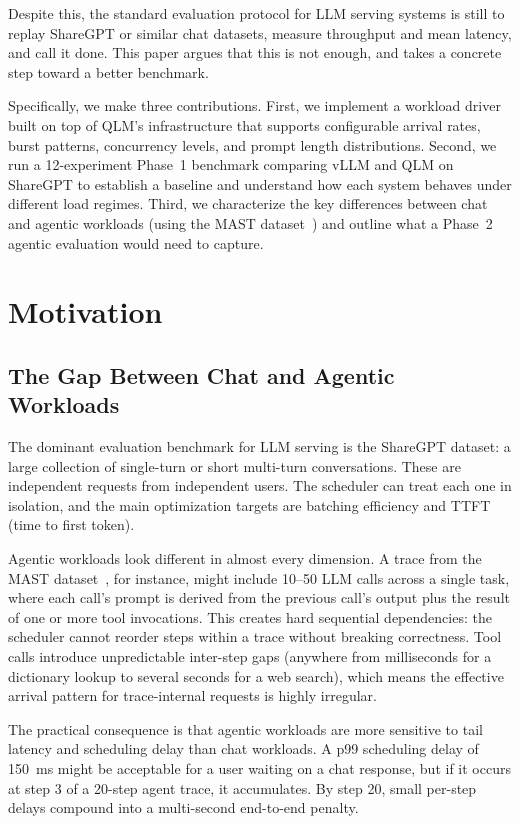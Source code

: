 \documentclass[10pt, twocolumn, letterpaper]{article}
\begin{document}
Despite this, the standard evaluation protocol for LLM serving systems is still to replay ShareGPT or similar chat datasets, measure throughput and mean latency, and call it done. This paper argues that this is not enough, and takes a concrete step toward a better benchmark.

Specifically, we make three contributions. First, we implement a workload driver built on top of QLM's infrastructure that supports configurable arrival rates, burst patterns, concurrency levels, and prompt length distributions. Second, we run a 12-experiment Phase~1 benchmark comparing vLLM and QLM on ShareGPT to establish a baseline and understand how each system behaves under different load regimes. Third, we characterize the key differences between chat and agentic workloads (using the MAST dataset~\cite{mast}) and outline what a Phase~2 agentic evaluation would need to capture.

\section{Motivation}

\subsection{The Gap Between Chat and Agentic Workloads}

The dominant evaluation benchmark for LLM serving is the ShareGPT dataset: a large collection of single-turn or short multi-turn conversations. These are independent requests from independent users. The scheduler can treat each one in isolation, and the main optimization targets are batching efficiency and TTFT (time to first token).

Agentic workloads look different in almost every dimension. A trace from the MAST dataset~\cite{mast}, for instance, might include 10--50 LLM calls across a single task, where each call's prompt is derived from the previous call's output plus the result of one or more tool invocations. This creates hard sequential dependencies: the scheduler cannot reorder steps within a trace without breaking correctness. Tool calls introduce unpredictable inter-step gaps (anywhere from milliseconds for a dictionary lookup to several seconds for a web search), which means the effective arrival pattern for trace-internal requests is highly irregular.

The practical consequence is that agentic workloads are more sensitive to tail latency and scheduling delay than chat workloads. A p99 scheduling delay of 150~ms might be acceptable for a user waiting on a chat response, but if it occurs at step 3 of a 20-step agent trace, it accumulates. By step 20, small per-step delays compound into a multi-second end-to-end penalty.
\end{document}
